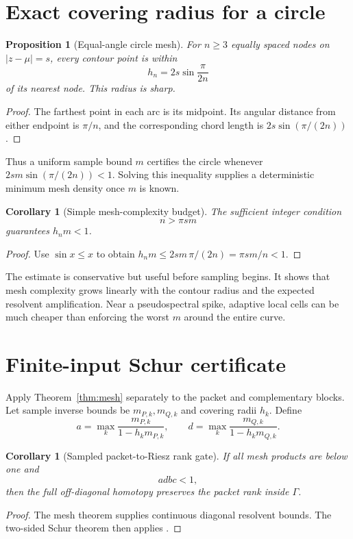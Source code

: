 \documentclass[12pt]{article}
\newtheorem{proposition}[theorem]{Proposition}
\newtheorem{corollary}[theorem]{Corollary}
\begin{document}
\section{Exact covering radius for a circle}
\begin{proposition}[Equal-angle circle mesh]\label{prop:circle}
For $n\ge3$ equally spaced nodes on $|z-\mu|=s$, every contour point is
within
\[
 h_n=2s\sin\frac{\pi}{2n}
\]
of its nearest node.  This radius is sharp.
\end{proposition}
\begin{proof}
The farthest point in each arc is its midpoint.  Its angular distance from
either endpoint is $\pi/n$, and the corresponding chord length is
$2s\sin(\pi/(2n))$.
\end{proof}

Thus a uniform sample bound $m$ certifies the circle whenever
$2sm\sin(\pi/(2n))<1$.  Solving this inequality supplies a deterministic
minimum mesh density once $m$ is known.

\begin{corollary}[Simple mesh-complexity budget]
The sufficient integer condition
\[
 n>\pi sm
\]
guarantees $h_nm<1$.
\end{corollary}
\begin{proof}
Use $\sin x\le x$ to obtain
$h_nm\le2sm\,\pi/(2n)=\pi sm/n<1$.
\end{proof}

The estimate is conservative but useful before sampling begins.  It shows
that mesh complexity grows linearly with the contour radius and the expected
resolvent amplification.  Near a pseudospectral spike, adaptive local cells
can be much cheaper than enforcing the worst $m$ around the entire curve.

\section{Finite-input Schur certificate}
Apply Theorem~\ref{thm:mesh} separately to the packet and complementary
blocks.  Let sample inverse bounds be $m_{P,k},m_{Q,k}$ and covering radii
$h_k$.  Define
\[
 a=\max_k\frac{m_{P,k}}{1-h_km_{P,k}},\qquad
 d=\max_k\frac{m_{Q,k}}{1-h_km_{Q,k}}.
\]

\begin{corollary}[Sampled packet-to-Riesz rank gate]
If all mesh products are below one and
\[
 adbc<1,
\]
then the full off-diagonal homotopy preserves the packet rank inside
$\Gamma$.
\end{corollary}
\begin{proof}
The mesh theorem supplies continuous diagonal resolvent bounds.  The
two-sided Schur theorem then applies \citep{WangRH163}.
\end{proof}
\end{document}

